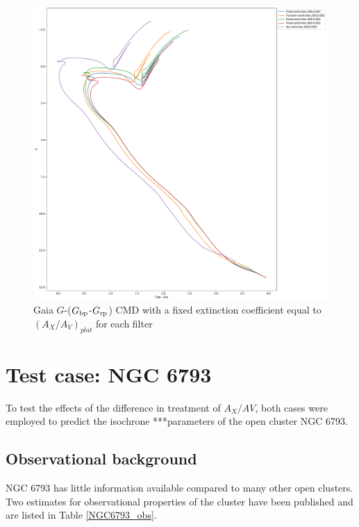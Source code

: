 \documentclass[12pt, a4paper]{report}
\begin{document}
\begin{figure}[h]
\begin{center}
\includegraphics[scale=0.3]{../basti_isochrones_10_13Gyr/Extinction_T50k_FeH0fix_func_G_GbpmGrp_500_400_600_Myr_FeH_0p002_ref_noext_Av_1p0.pdf}
\caption{Gaia $G$-($G_{\textnormal{bp}}$-$G_{\textnormal{rp}}$) CMD with a fixed extinction coefficient equal to $(A_{X}/A_{V})_{plat}$ for each filter}
\label{gaia_isoc_T50k}
\end{center}
\end{figure}

\section{Test case: NGC 6793}
To test the effects of the difference in treatment of $A_{X}/A{V}$, both cases were employed to predict the isochrone ***parameters of the open cluster NGC 6793.

\subsection{Observational background}
NGC 6793 has little information available compared to many other open clusters. Two estimates for observational properties of the cluster have been published and are listed in Table \ref{NGC6793_obs}.
\end{document}
